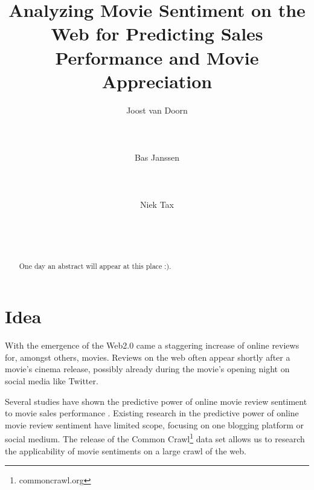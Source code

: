 \documentclass{sig-alternate-br}
\begin{document}

\title{Analyzing Movie Sentiment on the Web for Predicting Sales Performance and Movie Appreciation}

\author{
\alignauthor Joost van Doorn\\
       \\
       \\
       \\
\alignauthor Bas Janssen\\
       \\
       \\
       \\
\alignauthor Niek Tax\\
       \\
       \\
       \\
}

\maketitle
\begin{abstract}
One day an abstract will appear at this place :).
\end{abstract} 


\section{Idea}
With the emergence of the Web2.0 came a staggering increase of online reviews for, amongst others, movies. Reviews on the web often appear shortly after a movie's cinema release, possibly already during the movie's opening night on social media like Twitter. 

Several studies have shown the predictive power of online movie review sentiment to movie sales performance \cite{Mishne2006, Liu2007, Dellarocas2007, Asur2010, Joshi2010, Yu2012}. Existing research in the predictive power of online movie review sentiment have limited scope, focusing on one blogging platform or social medium. The release of the Common Crawl\footnote{commoncrawl.org} data set allows us to research the applicability of movie sentiments on a large crawl of the web.  
\end{document}
